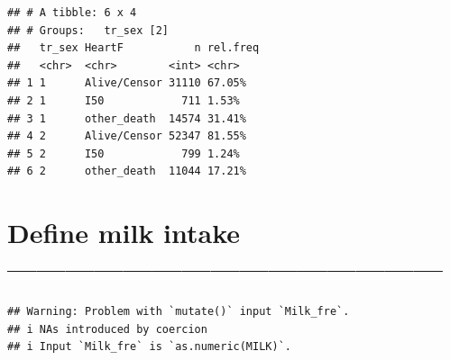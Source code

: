 \documentclass[
]{article}
\newenvironment{Shaded}{\begin{snugshade}}{\end{snugshade}}
\newcommand{\DataTypeTok}[1]{\textcolor[rgb]{0.13,0.29,0.53}{#1}}
\newcommand{\DecValTok}[1]{\textcolor[rgb]{0.00,0.00,0.81}{#1}}
\newcommand{\KeywordTok}[1]{\textcolor[rgb]{0.13,0.29,0.53}{\textbf{#1}}}
\newcommand{\NormalTok}[1]{#1}
\newcommand{\OperatorTok}[1]{\textcolor[rgb]{0.81,0.36,0.00}{\textbf{#1}}}
\newcommand{\StringTok}[1]{\textcolor[rgb]{0.31,0.60,0.02}{#1}}
\begin{document}
\begin{verbatim}
## # A tibble: 6 x 4
## # Groups:   tr_sex [2]
##   tr_sex HeartF           n rel.freq
##   <chr>  <chr>        <int> <chr>   
## 1 1      Alive/Censor 31110 67.05%  
## 2 1      I50            711 1.53%   
## 3 1      other_death  14574 31.41%  
## 4 2      Alive/Censor 52347 81.55%  
## 5 2      I50            799 1.24%   
## 6 2      other_death  11044 17.21%
\end{verbatim}

\hypertarget{define-milk-intake}{%
\section{Define milk intake
---------------------------------------------}\label{define-milk-intake}}

\begin{Shaded}
\end{Shaded}

\begin{verbatim}
## Warning: Problem with `mutate()` input `Milk_fre`.
## i NAs introduced by coercion
## i Input `Milk_fre` is `as.numeric(MILK)`.
\end{verbatim}
\end{document}
